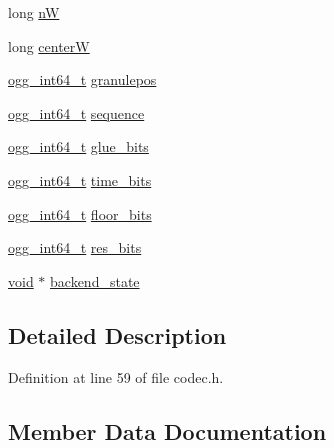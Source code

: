 \begin{DoxyCompactItemize}
\item 
long \hyperlink{structvorbis__dsp__state_a2ada93ee1004bcc0803238ee4416bc1e}{nW}
\item 
long \hyperlink{structvorbis__dsp__state_a241d3dc3b6c931e93ce53cbf69282350}{centerW}
\item 
\hyperlink{config__types_8h_a292432ede703993aa88db876e11b2306}{ogg\+\_\+int64\+\_\+t} \hyperlink{structvorbis__dsp__state_af84a7a4855db2744d1ef73f48cb6b352}{granulepos}
\item 
\hyperlink{config__types_8h_a292432ede703993aa88db876e11b2306}{ogg\+\_\+int64\+\_\+t} \hyperlink{structvorbis__dsp__state_a38a8b96daf9d16d8cce0522e203635a6}{sequence}
\item 
\hyperlink{config__types_8h_a292432ede703993aa88db876e11b2306}{ogg\+\_\+int64\+\_\+t} \hyperlink{structvorbis__dsp__state_ae2d065c13e84870fd889c82cd2e7a04f}{glue\+\_\+bits}
\item 
\hyperlink{config__types_8h_a292432ede703993aa88db876e11b2306}{ogg\+\_\+int64\+\_\+t} \hyperlink{structvorbis__dsp__state_adef49c2187f4ed3381973274e1b01151}{time\+\_\+bits}
\item 
\hyperlink{config__types_8h_a292432ede703993aa88db876e11b2306}{ogg\+\_\+int64\+\_\+t} \hyperlink{structvorbis__dsp__state_a2913a4ebbbd6721c53264a2ca8466cea}{floor\+\_\+bits}
\item 
\hyperlink{config__types_8h_a292432ede703993aa88db876e11b2306}{ogg\+\_\+int64\+\_\+t} \hyperlink{structvorbis__dsp__state_a3091c7fac6b57c54027c32931a7e6ee0}{res\+\_\+bits}
\item 
\hyperlink{sound_8c_ae35f5844602719cf66324f4de2a658b3}{void} $\ast$ \hyperlink{structvorbis__dsp__state_a97ff4df8d289e5e3968029e47d7f8162}{backend\+\_\+state}
\end{DoxyCompactItemize}


\subsection{Detailed Description}


Definition at line 59 of file codec.\+h.



\subsection{Member Data Documentation}
